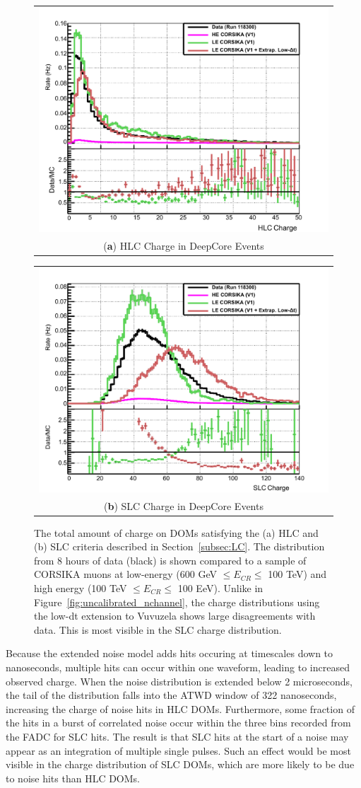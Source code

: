 \begin{figure}[h]
\centering
\begin{tabular}[b]{c}
  \includegraphics[width=0.45\linewidth]{old_HLC_Charge.pdf} \\
  \small (\textbf{\color{ctcolormain}a}) HLC Charge in DeepCore Events
\end{tabular} \hspace{2pt}
\begin{tabular}[b]{c}
  \includegraphics[width=0.45\linewidth]{old_SLC_Charge.pdf} \\
  \small (\textbf{\color{ctcolormain}b}) SLC Charge in DeepCore Events
\end{tabular}
\caption[HLC and SLC charge with Vuvuzela V1]{The total amount of charge on DOMs satisfying the (a) HLC and (b) SLC criteria described in Section~\ref{subsec:LC}. The distribution from 8 hours of data (black) is shown compared to a sample of CORSIKA muons at low-energy (600 GeV $\leq E_{CR} \leq$ 100 TeV) and high energy (100 TeV $\leq E_{CR} \leq$ 100 EeV). Unlike in Figure~\ref{fig:uncalibrated_nchannel}, the charge distributions using the low-dt extension to Vuvuzela shows large disagreements with data. This is most visible in the SLC charge distribution.}
\label{fig:uncalibrated_charge}
\end{figure}

Because the extended noise model adds hits occuring at timescales down to nanoseconds, multiple hits can occur within one waveform, leading to increased observed charge.
When the noise distribution is extended below 2 microseconds, the tail of the distribution falls into the ATWD window of 322 nanoseconds, increasing the charge of noise hits in HLC DOMs.
Furthermore, some fraction of the hits in a burst of correlated noise occur within the three bins recorded from the FADC for SLC hits.
The result is that SLC hits at the start of a noise may appear as an integration of multiple single pulses.
Such an effect would be most visible in the charge distribution of SLC DOMs, which are more likely to be due to noise hits than HLC DOMs.

